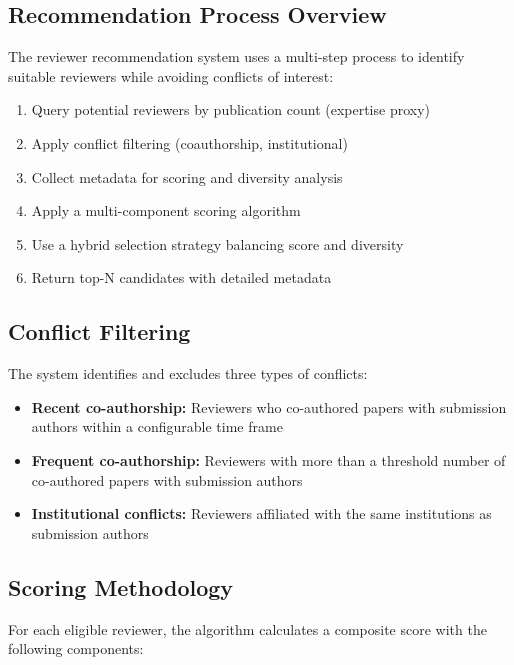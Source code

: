 \subsection{Recommendation Process Overview}
The reviewer recommendation system uses a multi-step process to identify suitable reviewers while avoiding conflicts of interest:

\begin{enumerate}
    \item Query potential reviewers by publication count (expertise proxy)
    \item Apply conflict filtering (coauthorship, institutional)
    \item Collect metadata for scoring and diversity analysis
    \item Apply a multi-component scoring algorithm
    \item Use a hybrid selection strategy balancing score and diversity
    \item Return top-N candidates with detailed metadata
\end{enumerate}

\subsection{Conflict Filtering}
The system identifies and excludes three types of conflicts:

\begin{itemize}
    \item \textbf{Recent co-authorship:} Reviewers who co-authored papers with submission authors within a configurable time frame
    \item \textbf{Frequent co-authorship:} Reviewers with more than a threshold number of co-authored papers with submission authors
    \item \textbf{Institutional conflicts:} Reviewers affiliated with the same institutions as submission authors
\end{itemize}

\subsection{Scoring Methodology}
For each eligible reviewer, the algorithm calculates a composite score with the following components:

